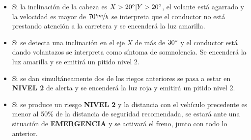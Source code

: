 \begin{enumerate}
\begin{itemize}
          \item Si la inclinación de la cabeza es $X > 20\degree | Y > 20\degree$, el volante
                está agarrado y la velocidad es mayor de $70\nicefrac{km}{h}$ se interpreta
                que el conductor no está prestando atención a la carretera y se encenderá la
                luz amarilla.
          \item Si se detecta una inclinación en el eje $X$ de más de $30\degree$ y el
                conductor está dando volantazos se interpreta como síntoma de somnolencia.
                Se encenderá la luz amarilla y se emitirá un pitido nivel 2.
          \item Si se dan simultáneamente dos de los riegos anteriores se pasa a estar en 
                \textbf{NIVEL 2} de alerta y se encenderá la luz roja y emitirá un pitido
                nivel 2.
          \item Si se produce un riesgo \textbf{NIVEL 2} y la distancia con el vehículo
                precedente es menor al 50\% de la distancia de seguridad recomendada, se
                estará ante una situación de \textbf{EMERGENCIA} y se activará el freno, 
                junto con todo lo anterior.
        \end{itemize}
\end{enumerate}